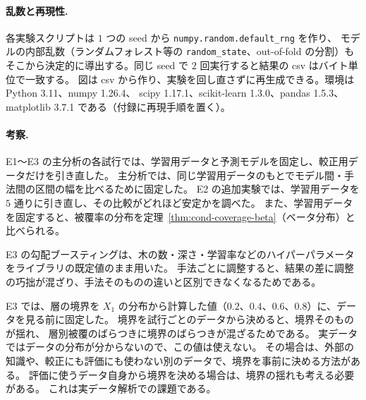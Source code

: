 \documentclass[a4paper,11pt]{jsarticle}
\theoremstyle{definition}
\theoremstyle{plain}
\theoremstyle{remark}
\begin{document}
\paragraph{乱数と再現性.}
各実験スクリプトは $1$ つの seed から \texttt{numpy.random.default\_rng} を作り、
モデルの内部乱数（ランダムフォレスト等の \texttt{random\_state}、out-of-fold の分割）も
そこから決定的に導出する。同じ seed で $2$ 回実行すると結果の csv はバイト単位で一致する。
図は csv から作り、実験を回し直さずに再生成できる。環境は Python 3.11、numpy 1.26.4、
scipy 1.17.1、scikit-learn 1.3.0、pandas 1.5.3、matplotlib 3.7.1 である（付録に再現手順を置く）。

\paragraph{考察.}
E1〜E3 の主分析の各試行では、学習用データと予測モデルを固定し、較正用データだけを引き直した。
主分析では、同じ学習用データのもとでモデル間・手法間の区間の幅を比べるために固定した。
E2 の追加実験では、学習用データを $5$ 通りに引き直し、その比較がどれほど安定かを調べた。
また、学習用データを固定すると、被覆率の分布を定理~\ref{thm:cond-coverage-beta}（ベータ分布）と比べられる。

E3 の勾配ブースティングは、木の数・深さ・学習率などのハイパーパラメータをライブラリの既定値のまま用いた。
手法ごとに調整すると、結果の差に調整の巧拙が混ざり、手法そのものの違いと区別できなくなるためである。

E3 では、層の境界を $X_1$ の分布から計算した値（$0.2$、$0.4$、$0.6$、$0.8$）に、データを見る前に固定した。
境界を試行ごとのデータから決めると、境界そのものが揺れ、
層別被覆のばらつきに境界のばらつきが混ざるためである。
実データではデータの分布が分からないので、この値は使えない。
その場合は、外部の知識や、較正にも評価にも使わない別のデータで、境界を事前に決める方法がある。
評価に使うデータ自身から境界を決める場合は、境界の揺れも考える必要がある。
これは実データ解析での課題である。

\end{document}

